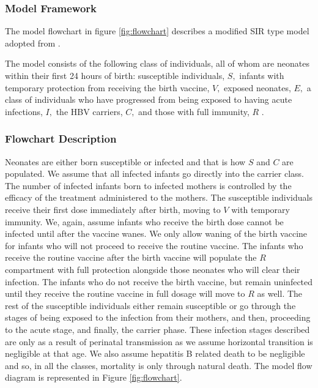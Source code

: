  	\subsubsection{Model Framework}
 	The model flowchart in figure \ref{fig:flowchart} describes a modified SIR type model adopted from \cite{zou2010modeling}.
 	
 	The model consists of the following class of individuals, all of whom are neonates within their first 24 hours of birth: susceptible individuals, $S,$ infants with temporary protection from receiving the birth vaccine, $V,$ exposed neonates, $E,$ a class of individuals who have progressed from being exposed to having acute infections, $I,$ the HBV carriers, $C,$ and those with full immunity, $R$ .
 	
 	\subsubsection{Flowchart Description}
 		Neonates are either born susceptible or infected and that is how $S$ and $C$ are populated. We assume that all infected infants go directly into the carrier class. The number of infected infants born to infected mothers is controlled by the efficacy of the treatment administered to the mothers. The susceptible individuals receive their first dose immediately after birth, moving to $V$ with temporary immunity. We, again, assume infants who receive the birth dose cannot be infected until after the vaccine wanes. We only allow waning of the birth vaccine for infants who will not proceed to receive the routine vaccine. The infants who receive the routine vaccine after the birth vaccine will populate the $R$ compartment with full protection alongside those neonates who will clear their infection. The infants who do not receive the birth vaccine, but remain uninfected until they receive the routine vaccine in full dosage will move to $R$ as well. The rest of the susceptible individuals either remain susceptible or go through the stages of being exposed to the infection from their mothers, and then, proceeding to the acute stage, and finally, the carrier phase. These infection stages described are only as a result of perinatal transmission as we assume horizontal transition is negligible at that age. We also assume hepatitis B related death to be negligible and so, in all the classes, mortality is only through natural death. 
\clearpage 		
 		The model flow diagram is represented in Figure \ref{fig:flowchart}. 
